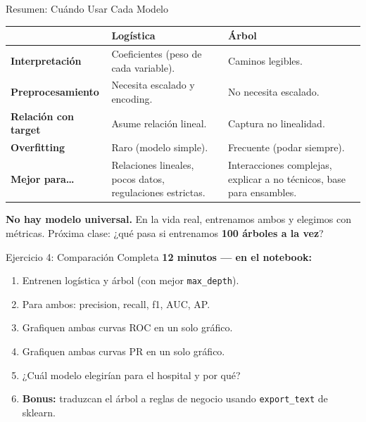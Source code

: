 \documentclass[aspectratio=169, 11pt]{beamer}
\begin{document}
\begin{frame}[shrink=5]{Resumen: Cuándo Usar Cada Modelo}
  \vspace{-4pt}
  {\scriptsize
  \begin{tabular}{@{}p{3.5cm}p{4.5cm}p{4.5cm}@{}}
    \toprule
     & \textbf{\color{codeBlue}Logística} & \textbf{\color{arcaRed}Árbol} \\
    \midrule
    \textbf{Interpretación} & Coeficientes (peso de cada variable). & Caminos legibles. \\
    \textbf{Preprocesamiento} & Necesita escalado y encoding. & No necesita escalado. \\
    \textbf{Relación con target} & Asume relación lineal. & Captura no linealidad. \\
    \textbf{Overfitting} & Raro (modelo simple). & Frecuente (podar siempre). \\
    \textbf{Mejor para\ldots} & Relaciones lineales, pocos datos, regulaciones estrictas. & Interacciones complejas, explicar a no técnicos, base para ensambles. \\
    \bottomrule
  \end{tabular}
  }

  \vspace{6pt}
  \begin{tcolorbox}[colback=arcaGray, colframe=arcaRed, boxrule=0.5pt, arc=2pt,
    left=6pt, right=6pt, top=4pt, bottom=4pt]
    {\scriptsize\color{arcaDark}
    \faKey\hspace{4pt}\textbf{No hay modelo universal.} En la vida real,
    entrenamos ambos y elegimos con métricas.
    Próxima clase: ¿qué pasa si entrenamos \textbf{100 árboles a la vez}?}
  \end{tcolorbox}
\end{frame}

\begin{frame}[shrink=5]{Ejercicio 4: Comparación Completa}
  \vspace{-4pt}
  {\footnotesize\color{arcaDark}\bfseries
    \faClock\hspace{4pt} 12 minutos --- en el notebook:}

  \vspace{6pt}
  {\footnotesize
  \begin{enumerate}\setlength{\itemsep}{4pt}
    \item Entrenen logística y árbol (con mejor \texttt{max\_depth}).
    \item Para ambos: precision, recall, f1, AUC, AP.
    \item Grafiquen ambas curvas ROC en un solo gráfico.
    \item Grafiquen ambas curvas PR en un solo gráfico.
    \item ¿Cuál modelo elegirían para el hospital y por qué?
    \item \textbf{Bonus:} traduzcan el árbol a reglas de negocio usando
      \texttt{export\_text} de sklearn.
  \end{enumerate}
  }
\end{frame}
\end{document}
